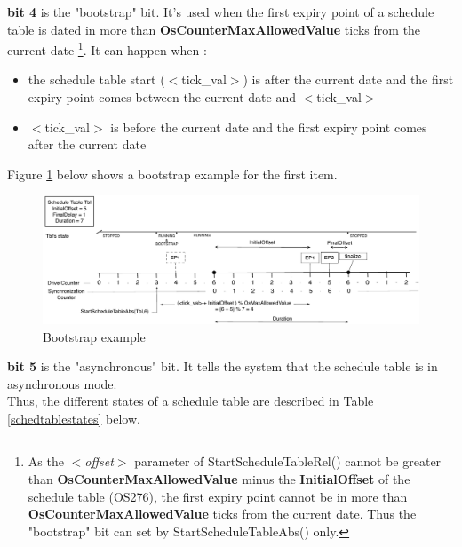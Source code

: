 \textbf{bit 4} is the "bootstrap" bit. It's used when the first expiry point of a schedule table is dated in more than \textbf{OsCounterMaxAllowedValue} ticks from the current date \footnote{As the \textit{$<$offset$>$} parameter of StartScheduleTableRel() cannot be greater than \textbf{OsCounterMaxAllowedValue} minus the \textbf{InitialOffset} of the schedule table (OS276), the first expiry point cannot be in more than \textbf{OsCounterMaxAllowedValue} ticks from the current date. Thus the "bootstrap" bit can set by StartScheduleTableAbs() only.}. It can happen when :
	\begin{itemize}
	\item the schedule table start ($<$tick\_val$>$) is after the current date and the first expiry point comes between the current date and $<$tick\_val$>$
	\item $<$tick\_val$>$ is before the current date and the first expiry point comes after the current date
	\end{itemize}

Figure \ref{fig:bootstrapexample} below shows a bootstrap example for the first item.

\begin{figure}[H] %
   \centering
   \includegraphics[scale=0.6]{pictures/BootstrapExample.pdf}  
   \caption{Bootstrap example}
   \label{fig:bootstrapexample}
\end{figure} 

\textbf{bit 5} is the "asynchronous" bit. It tells the system that the schedule table is in asynchronous mode.\\
Thus, the different states of a schedule table are described in Table \ref{schedtablestates} below.



